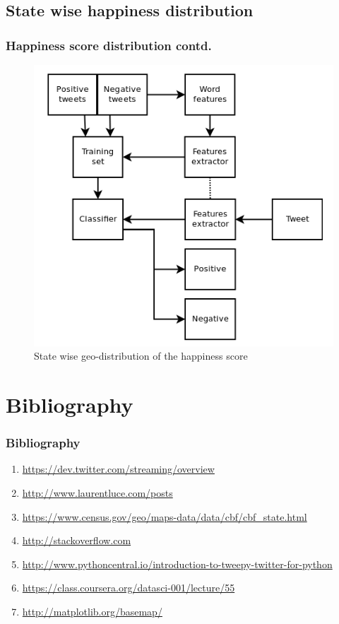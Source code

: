 \documentclass{beamer}
\begin{document}
\subsection{State wise happiness distribution}
\begin{frame}
\frametitle{Happiness score distribution contd.}
\begin{figure}
\includegraphics[scale=0.35]{./Images/NLTK}
\caption{State wise geo-distribution of the happiness score}
\end{figure}
\end{frame}

\section{Bibliography}
\begin{frame}
\frametitle{Bibliography}
\begin{enumerate}
\item \url{https://dev.twitter.com/streaming/overview}
\item \url{http://www.laurentluce.com/posts}
\item \url{https://www.census.gov/geo/maps-data/data/cbf/cbf_state.html}
\item \url{http://stackoverflow.com}
\item \url{http://www.pythoncentral.io/introduction-to-tweepy-twitter-for-python}
\item \url{https://class.coursera.org/datasci-001/lecture/55}
\item \url{http://matplotlib.org/basemap/}
\end{enumerate}
\end{frame}
\end{document}
